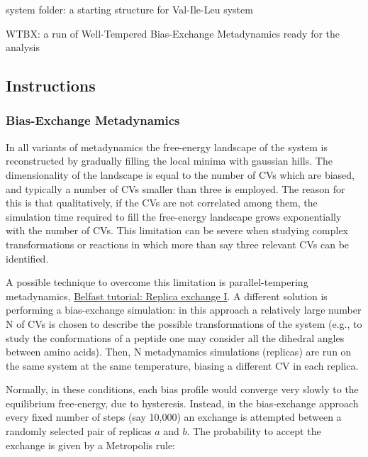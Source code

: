 \begin{DoxyItemize}
\item system folder\+: a starting structure for Val-\/\+Ile-\/\+Leu system
\item W\+T\+B\+X\+: a run of Well-\/\+Tempered Bias-\/\+Exchange Metadynamics ready for the analysis
\end{DoxyItemize}\hypertarget{belfast-10_Instructions}{}\subsection{Instructions}\label{belfast-10_Instructions}
\hypertarget{belfast-8_bemeta}{}\subsubsection{Bias-\/\+Exchange Metadynamics}\label{belfast-8_bemeta}
In all variants of metadynamics the free-\/energy landscape of the system is reconstructed by gradually filling the local minima with gaussian hills. The dimensionality of the landscape is equal to the number of C\+Vs which are biased, and typically a number of C\+Vs smaller than three is employed. The reason for this is that qualitatively, if the C\+Vs are not correlated among them, the simulation time required to fill the free-\/energy landscape grows exponentially with the number of C\+Vs. This limitation can be severe when studying complex transformations or reactions in which more than say three relevant C\+Vs can be identified.

A possible technique to overcome this limitation is parallel-\/tempering metadynamics, \hyperlink{belfast-7}{Belfast tutorial\+: Replica exchange I}. A different solution is performing a bias-\/exchange simulation\+: in this approach a relatively large number N of C\+Vs is chosen to describe the possible transformations of the system (e.\+g., to study the conformations of a peptide one may consider all the dihedral angles between amino acids). Then, N metadynamics simulations (replicas) are run on the same system at the same temperature, biasing a different C\+V in each replica.

Normally, in these conditions, each bias profile would converge very slowly to the equilibrium free-\/energy, due to hysteresis. Instead, in the bias-\/exchange approach every fixed number of steps (say 10,000) an exchange is attempted between a randomly selected pair of replicas $ a $ and $ b $. The probability to accept the exchange is given by a Metropolis rule\+:

